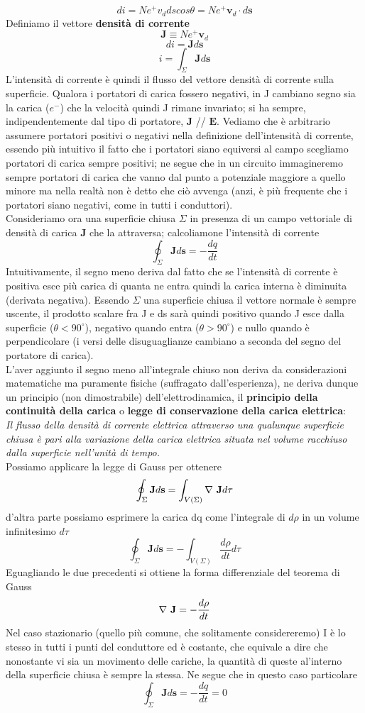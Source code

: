 \documentclass[
10pt, %
a4paper, %
oneside, %
headinclude,footinclude, %
BCOR5mm, %
]{scrartcl}
\begin{document}
\[di = N e^+ v_d ds cos\theta = N e^+ \mathbf{v}_d\cdot d\mathbf{s}\]
Definiamo il vettore \textbf{densità di corrente}
\[\mathbf{J} \equiv N e^+ \mathbf{v}_d\]
\[di = \mathbf{J}d\mathbf{s}\]
\[i = \int_{\Sigma} \mathbf{J}d\mathbf{s}\]
L'intensità di corrente è quindi il flusso del vettore densità di corrente sulla superficie. Qualora i portatori di carica fossero negativi, in J cambiano segno sia la carica (\(e^-\)) che la velocità quindi J rimane invariato; si ha sempre, indipendentemente dal tipo di portatore, \(\mathbf{J}\) // $\mathbf{E}$. Vediamo che è arbitrario assumere portatori positivi o negativi nella definizione dell'intensità di corrente, essendo più intuitivo il fatto che i portatori siano equiversi al campo scegliamo portatori di carica sempre positivi; ne segue che in un circuito immagineremo sempre portatori di carica che vanno dal punto a potenziale maggiore a quello minore ma nella realtà non è detto che ciò avvenga (anzi, è più frequente che i portatori siano negativi, come in tutti i conduttori). \\
Consideriamo ora una superficie chiusa $\Sigma$ in presenza di un campo vettoriale di densità di carica $\mathbf{J}$ che la attraversa; calcoliamone l'intensità di corrente
\[\oint_\Sigma \mathbf{J}d\mathbf{s} = -\frac{dq}{dt}\]
Intuitivamente, il segno meno deriva dal fatto che se l'intensità di corrente è positiva esce più carica di quanta ne entra quindi la carica interna è diminuita (derivata negativa). Essendo $\Sigma$ una superficie chiusa il vettore normale è sempre uscente, il prodotto scalare fra J e ds sarà quindi positivo quando J esce dalla superficie ($\theta<90^\circ$), negativo quando entra ($\theta>90^\circ$) e nullo quando è perpendicolare (i versi delle disuguaglianze cambiano a seconda del segno del portatore di carica).\\
L'aver aggiunto il segno meno all'integrale chiuso non deriva da considerazioni matematiche ma puramente fisiche (suffragato dall'esperienza), ne deriva dunque un principio (non dimostrabile) dell'elettrodinamica, il \textbf{principio della continuità della carica} o \textbf{legge di conservazione della carica elettrica}:\\
\textit{Il flusso della densità di corrente elettrica attraverso una qualunque superficie chiusa è pari alla variazione della carica elettrica situata nel volume racchiuso dalla superficie nell'unità di tempo.}\\
Possiamo applicare la legge di Gauss per ottenere
\[\oint_\Sigma \mathbf{J}d\mathbf{s} = \int_{V(\Sigma)} \mathbf{\nabla\ }\mathbf{J} d\tau\]
d'altra parte possiamo esprimere la carica dq come l'integrale di \(d\rho\) in un volume infinitesimo \(d\tau\) 
\[\oint_\Sigma \mathbf{J}d\mathbf{s} = -\int_{V(\Sigma)}\frac{d\rho}{dt}d\tau\]
Eguagliando le due precedenti si ottiene la forma differenziale del teorema di Gauss
\[\mathbf{\nabla\ }\mathbf{J} = -\frac{d\rho}{dt}\]
Nel caso stazionario (quello più comune, che solitamente considereremo) I è lo stesso in tutti i punti del conduttore ed è costante, che equivale a dire che nonostante vi sia un movimento delle cariche, la quantità di queste al'interno della superficie chiusa è sempre la stessa. Ne segue che in questo caso particolare 
\[\oint_\Sigma \mathbf{J}d\mathbf{s} = -\frac{dq}{dt} = 0\]
\end{document}
